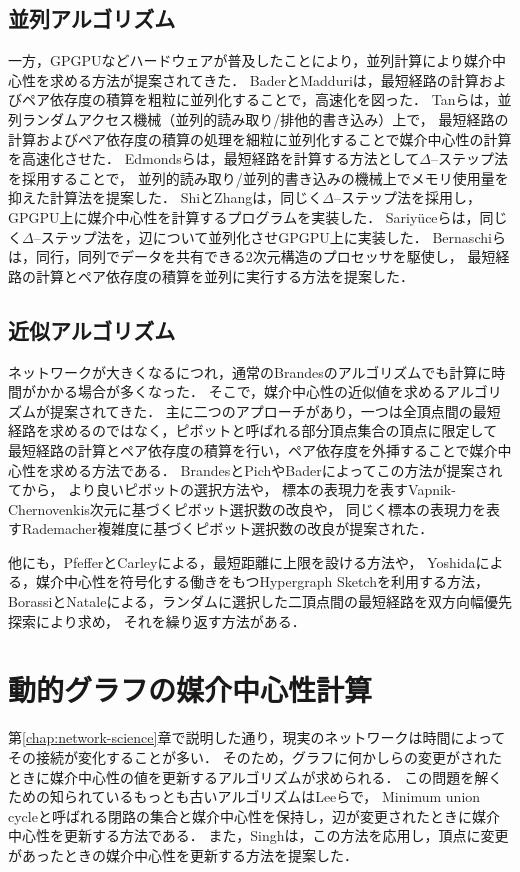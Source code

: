 \subsection{並列アルゴリズム}
一方，GPGPUなどハードウェアが普及したことにより，並列計算により媒介中心性を求める方法が提案されてきた．
BaderとMadduri\cite{Bader2006}は，最短経路の計算およびペア依存度の積算を粗粒に並列化することで，高速化を図った．
Tanら\cite{Tan2009}は，並列ランダムアクセス機械（並列的読み取り/排他的書き込み）上で，
最短経路の計算およびペア依存度の積算の処理を細粒に並列化することで媒介中心性の計算を高速化させた．
Edmondsら\cite{Edmonds2010}は，最短経路を計算する方法として$\Delta$--ステップ法を採用することで，
並列的読み取り/並列的書き込みの機械上でメモリ使用量を抑えた計算法を提案した．
ShiとZhang\cite{Shi2011}は，同じく$\Delta$--ステップ法を採用し，GPGPU上に媒介中心性を計算するプログラムを実装した．
Sariy{\"{u}}ceら\cite{Sariyuce2013}は，同じく$\Delta$--ステップ法を，辺について並列化させGPGPU上に実装した．
Bernaschiら\cite{Bernaschi2016}は，同行，同列でデータを共有できる2次元構造のプロセッサを駆使し，
最短経路の計算とペア依存度の積算を並列に実行する方法を提案した．

\subsection{近似アルゴリズム}
ネットワークが大きくなるにつれ，通常のBrandesのアルゴリズムでも計算に時間がかかる場合が多くなった．
そこで，媒介中心性の近似値を求めるアルゴリズムが提案されてきた．
主に二つのアプローチがあり，一つは全頂点間の最短経路を求めるのではなく，ピボットと呼ばれる部分頂点集合の頂点に限定して
最短経路の計算とペア依存度の積算を行い，ペア依存度を外挿することで媒介中心性を求める方法である\cite{Brandes2007}．
BrandesとPich\cite{Brandes2007}やBader\cite{Bader2007}によってこの方法が提案されてから，
より良いピボットの選択方法\cite{Geisberger2008,Chehreghani2014}や，
標本の表現力を表すVapnik-Chernovenkis次元に基づくピボット選択数の改良\cite{Riondato2014}や，
同じく標本の表現力を表すRademacher複雑度に基づくピボット選択数の改良\cite{Riondato2016}が提案された．

他にも，PfefferとCarleyによる，最短距離に上限を設ける方法\cite{Pfeffer2012}や，
Yoshidaによる，媒介中心性を符号化する働きをもつHypergraph Sketchを利用する方法\cite{Yoshida2014}，
BorassiとNataleによる，ランダムに選択した二頂点間の最短経路を双方向幅優先探索により求め，
それを繰り返す方法\cite{Borassi2019}がある．

\section{動的グラフの媒介中心性計算}
第\ref{chap:network-science}章で説明した通り，現実のネットワークは時間によってその接続が変化することが多い．
そのため，グラフに何かしらの変更がされたときに媒介中心性の値を更新するアルゴリズムが求められる．
この問題を解くための知られているもっとも古いアルゴリズムはLeeら\cite{Lee2012}で，
Minimum union cycleと呼ばれる閉路の集合と媒介中心性を保持し，辺が変更されたときに媒介中心性を更新する方法である．
また，Singh\cite{Singh2015}は，この方法を応用し，頂点に変更があったときの媒介中心性を更新する方法を提案した．

